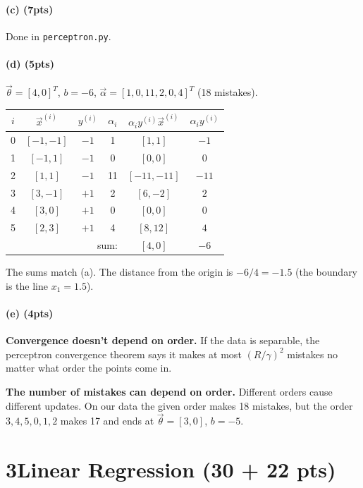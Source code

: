 \documentclass[11pt]{article}
\newcommand{\vth}{\vec\theta}
\newcommand{\x}[1]{\vec x^{(#1)}}
\begin{document}
\paragraph{(c) (7pts)} Done in \texttt{perceptron.py}.

\paragraph{(d) (5pts)} $\vth=[4,0]^T$, $b=-6$, $\vec\alpha=[1,0,11,2,0,4]^T$ (18 mistakes).
\begin{center}\small
\begin{tabular}{cccccc}
\toprule
$i$ & $\x i$ & $y^{(i)}$ & $\alpha_i$ & $\alpha_i y^{(i)}\x i$ & $\alpha_i y^{(i)}$\\\midrule
0 & $[-1,-1]$ & $-1$ & 1  & $[1,1]$     & $-1$\\
1 & $[-1,1]$  & $-1$ & 0  & $[0,0]$     & $0$\\
2 & $[1,1]$   & $-1$ & 11 & $[-11,-11]$ & $-11$\\
3 & $[3,-1]$  & $+1$ & 2  & $[6,-2]$    & $2$\\
4 & $[3,0]$   & $+1$ & 0  & $[0,0]$     & $0$\\
5 & $[2,3]$   & $+1$ & 4  & $[8,12]$    & $4$\\\midrule
\multicolumn{4}{r}{sum:} & $[4,0]$ & $-6$\\\bottomrule
\end{tabular}
\end{center}
The sums match (a). The distance from the origin is $-6/4=-1.5$ (the boundary is the line $x_1=1.5$).

\paragraph{(e) (4pts)} \textbf{Convergence doesn't depend on order.} If the data is separable, the perceptron convergence theorem says it makes at most $(R/\gamma)^2$ mistakes no matter what order the points come in.

\textbf{The number of mistakes can depend on order.} Different orders cause different updates. On our data the given order makes 18 mistakes, but the order $3,4,5,0,1,2$ makes 17 and ends at $\vth=[3,0]$, $b=-5$.

\section*{3\quad Linear Regression (30 + 22 pts)}
\end{document}
